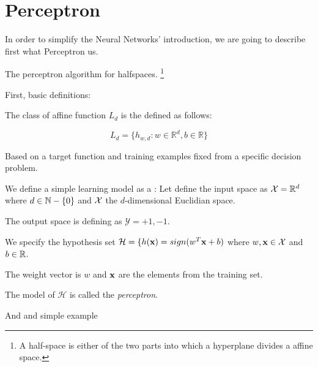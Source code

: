 



\chapter{Perceptron}

In order to simplify the Neural Networks' introduction, we are going 
to describe first 
what Perceptron us. 

The perceptron algorithm for halfspaces.
 \footnote{A half-space is either of the two parts into which a hyperplane divides a affine space. } 


 First, basic definitions: 

 The class of affine function  $L_d$ is the defined as follows:

 $$L_d = \{ h_{w,d}: w \in \mathbb{R}^d, b \in \mathbb R\}$$

Based on a target function
and  training examples fixed from a specific decision problem.  

We define a simple learning model as a : 
Let define the input space as $\mathcal{X} = \mathbb{R}^d$ where $d \in \mathbb{N}-\{0\}$ and $\mathcal{X}$ 
the $d$-dimensional Euclidian space. 

The output space is defining as $\mathcal{Y}={+1, -1}$. 

We specify the hypothesis set $\mathcal{H} = \{ h(\textbf{x}) = sign(w^T \textbf{x} +b)$ where $w, \textbf{x} \in \mathcal{X}$
and $b \in \mathbb{R}$. 

The weight vector is $w$ and $\textbf{x}$ are the elements from the training set. 

The model of $\mathcal{H}$ is called the \textit{perceptron}.  

And and simple example 

